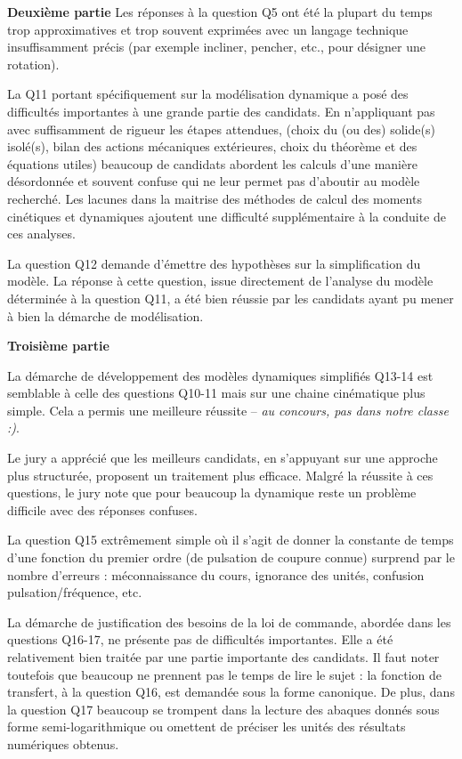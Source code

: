 \documentclass[10pt,fleqn]{article} %
\begin{document}
\textbf{Deuxième partie}
Les réponses à la question Q5 ont
été la plupart du temps trop approximatives et trop souvent exprimées avec un langage technique
insuffisamment précis (par exemple incliner, pencher, etc., pour désigner une rotation).


La Q11 portant spécifiquement sur la modélisation dynamique a posé des difficultés importantes à une grande partie des candidats. En n’appliquant pas
avec suffisamment de rigueur les étapes attendues, (choix du (ou des) solide(s) isolé(s), bilan des
actions mécaniques extérieures, choix du théorème et des équations utiles) beaucoup de candidats
abordent les calculs d’une manière désordonnée et souvent confuse qui ne leur permet pas d’aboutir
au modèle recherché. Les lacunes dans la maitrise des méthodes de calcul des moments cinétiques
et dynamiques ajoutent une difficulté supplémentaire à la conduite de ces analyses.

La question Q12 demande d’émettre des hypothèses sur la simplification du modèle. La réponse à
cette question, issue directement de l’analyse du modèle déterminée à la question Q11, a été bien
réussie par les candidats ayant pu mener à bien la démarche de modélisation.



\textbf{Troisième partie}

La démarche de développement des modèles dynamiques simplifiés Q13-14 est semblable à celle
des questions Q10-11 mais sur une chaine cinématique plus simple. Cela a permis une meilleure
réussite -- \textit{au concours, pas dans notre classe :)}.

Le jury a apprécié que les meilleurs candidats, en s’appuyant sur une approche plus
structurée, proposent un traitement plus efficace. Malgré la réussite à ces questions, le jury note
que pour beaucoup la dynamique reste un problème difficile avec des réponses confuses.

La question Q15 extrêmement simple où il s’agit de donner la constante de temps d’une fonction du
premier ordre (de pulsation de coupure connue) surprend par le nombre d’erreurs : méconnaissance
du cours, ignorance des unités, confusion pulsation/fréquence, etc.

La démarche de justification des besoins de la loi de commande, abordée dans les questions Q16-17,
ne présente pas de difficultés importantes. Elle a été relativement bien traitée par une partie
importante des candidats. Il faut noter toutefois que beaucoup ne prennent pas le temps de lire
le sujet : la fonction de transfert, à la question Q16, est demandée sous la forme canonique. De
plus, dans la question Q17 beaucoup se trompent dans la lecture des abaques donnés sous forme
semi-logarithmique ou omettent de préciser les unités des résultats numériques obtenus.
\end{document}

